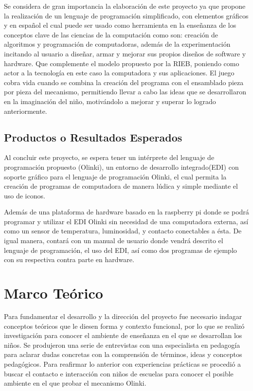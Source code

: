 \documentclass[letterpaper,10pt]{article}
\begin{document}
Se considera de gran importancia la elaboración de este proyecto ya que propone la realización
de un lenguaje de programación simplificado, con elementos gráficos y en español el cual
puede ser usado como herramienta en la enseñanza de los conceptos clave de las ciencias de la 
computación como son: creación de algoritmos y programación de computadoras, además de la 
experimentación incitando al usuario a diseñar, armar y mejorar sus propios diseños de software
y hardware. Que complemente el modelo propuesto por la RIEB, poniendo como actor a la tecnología
en este caso la computadora y sus aplicaciones.\newline
El juego cobra vida cuando se combina la creación del programa con el ensamblado 
pieza por pieza del mecanismo, permitiendo llevar a cabo las ideas que se 
desarrollaron en la imaginación del niño, motivándolo a mejorar y  superar lo logrado
anteriormente.



\subsection{Productos o Resultados Esperados}

Al concluir este proyecto, se espera tener un intérprete del lenguaje de programación
propuesto (Olinki), un entorno de desarrollo integrado(EDI)
con soporte gráfico para el lenguaje de programación Olinki, el cual permita la creación
de programas de computadora de manera lúdica y simple mediante el uso de iconos.

Además de una plataforma de hardware basado en la raspberry pi donde se podrá programar y utilizar el EDI Olinki 
sin necesidad de una computadora externa, así como un sensor de temperatura, luminosidad, y contacto
 conectables a ésta.\newline
 De igual manera, contará con un manual de usuario donde vendrá descrito el lenguaje de programación,
 el uso del EDI, así como dos programas de ejemplo con su respectiva contra parte en hardware.
 

\section{Marco Teórico}

Para fundamentar el desarrollo y la dirección del proyecto fue necesario indagar conceptos
teóricos que le diesen forma y contexto funcional, por lo que se realizó 
investigación para conocer el ambiente de enseñanza en el que se desarrollan los niños.
Se produjeron una serie de entrevistas con una especialista en pedagogía para
aclarar dudas concretas con  la comprensión de términos, ideas y conceptos pedagógicos.
Para reafirmar lo anterior con experiencias prácticas se procedió a buscar el contacto e
interacción con niños de escuelas para conocer el posible ambiente en el que probar el
mecanismo Olinki.\newline
\end{document}
